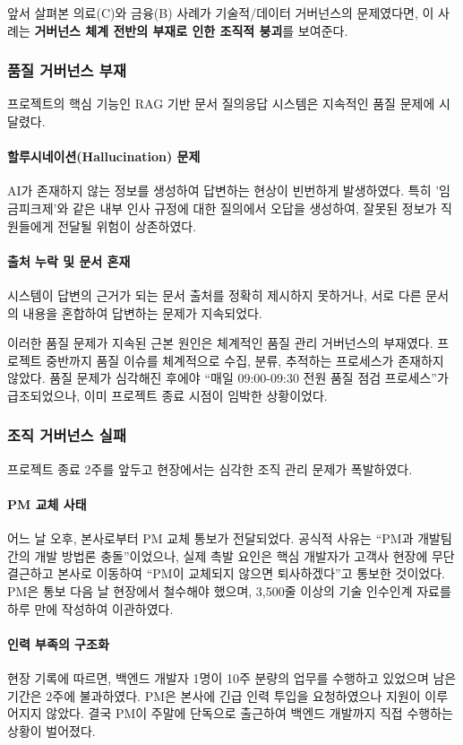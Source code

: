 앞서 살펴본 의료(C)와 금융(B) 사례가 기술적/데이터 거버넌스의 문제였다면, 이 사례는 \textbf{거버넌스 체계 전반의 부재로 인한 조직적 붕괴}를 보여준다.

\subsubsection{품질 거버넌스 부재}
프로젝트의 핵심 기능인 RAG 기반 문서 질의응답 시스템은 지속적인 품질 문제에 시달렸다.

\paragraph{할루시네이션(Hallucination) 문제}
AI가 존재하지 않는 정보를 생성하여 답변하는 현상이 빈번하게 발생하였다. 특히 '임금피크제'와 같은 내부 인사 규정에 대한 질의에서 오답을 생성하여, 잘못된 정보가 직원들에게 전달될 위험이 상존하였다.

\paragraph{출처 누락 및 문서 혼재}
시스템이 답변의 근거가 되는 문서 출처를 정확히 제시하지 못하거나, 서로 다른 문서의 내용을 혼합하여 답변하는 문제가 지속되었다.

이러한 품질 문제가 지속된 근본 원인은 체계적인 품질 관리 거버넌스의 부재였다. 프로젝트 중반까지 품질 이슈를 체계적으로 수집, 분류, 추적하는 프로세스가 존재하지 않았다. 품질 문제가 심각해진 후에야 ``매일 09:00-09:30 전원 품질 점검 프로세스''가 급조되었으나, 이미 프로젝트 종료 시점이 임박한 상황이었다.

\subsubsection{조직 거버넌스 실패}
프로젝트 종료 2주를 앞두고 현장에서는 심각한 조직 관리 문제가 폭발하였다.

\paragraph{PM 교체 사태}
어느 날 오후, 본사로부터 PM 교체 통보가 전달되었다. 공식적 사유는 ``PM과 개발팀 간의 개발 방법론 충돌''이었으나, 실제 촉발 요인은 핵심 개발자가 고객사 현장에 무단 결근하고 본사로 이동하여 ``PM이 교체되지 않으면 퇴사하겠다''고 통보한 것이었다. PM은 통보 다음 날 현장에서 철수해야 했으며, 3,500줄 이상의 기술 인수인계 자료를 하루 만에 작성하여 이관하였다.

\paragraph{인력 부족의 구조화}
현장 기록에 따르면, 백엔드 개발자 1명이 10주 분량의 업무를 수행하고 있었으며 남은 기간은 2주에 불과하였다. PM은 본사에 긴급 인력 투입을 요청하였으나 지원이 이루어지지 않았다. 결국 PM이 주말에 단독으로 출근하여 백엔드 개발까지 직접 수행하는 상황이 벌어졌다.

